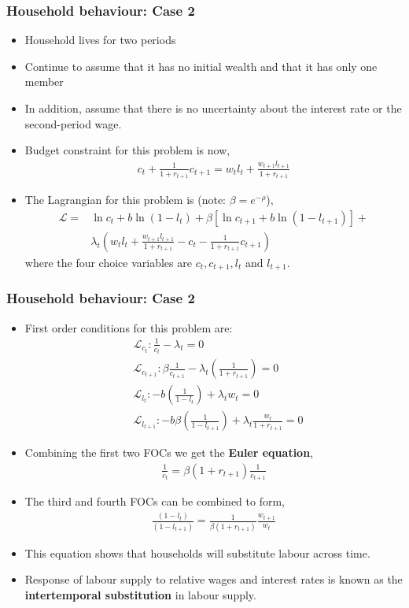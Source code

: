 \documentclass[10pt, handout]{beamer} %
\begin{document}
\begin{frame}
\frametitle{Household behaviour: Case 2}
\small
\begin{itemize}[<+->]
\item Household lives for two periods
\item Continue to assume that it has no initial wealth and that it has only one member
\item In addition, assume that there is no uncertainty about the interest rate or the
second-period wage.
\item Budget constraint for this problem is now,
\begin{align*}
c_{t} + \frac{1}{1+r_{t+1}}c_{t+1} = w_{t}l_{t} + \frac{w_{t+1}l_{t+1}}{1+r_{t+1}}
\end{align*}
\item The Lagrangian for this problem is (note: $\beta = e^{-\rho}$),
\begin{align*}
\mathcal{L} = &\ln{c_{t}} + b\ln(1-l_{t}) + \beta[\ln{c_{t+1}} + b\ln({1 - l_{t+1}})] + \\
& \lambda_{t}\left(w_{t}l_{t} + \frac{w_{t+1}l_{t+1}}{1+r_{t+1}} - c_{t} - \frac{1}{1+r_{t+1}}c_{t+1} \right)
\end{align*}
where the four choice variables are $c_{t}, c_{t+1}, l_{t}$ and $l_{t+1}$.
\end{itemize}
\end{frame}

\begin{frame}
\frametitle{Household behaviour: Case 2}
\small
\begin{itemize}[<+->]
\item First order conditions for this problem are:
\begin{align*}
&\mathcal{L}_{c_t} : \frac{1}{c_{t}} - \lambda_{t} = 0 \\
&\mathcal{L}_{c_{t+1}} : \beta\frac{1}{c_{t+1}} - \lambda_{t}\left(\frac{1}{1 + r_{t+1}}\right) = 0\\
&\mathcal{L}_{l_t} : -b\left(\frac{1}{1 - l_{t}}\right) + \lambda_{t}w_{t} = 0 \\
&\mathcal{L}_{l_{t+1}} : -b\beta\left(\frac{1}{1 - l_{t+1}}\right) + \lambda_{t}\frac{w_{t}}{1+r_{t+1}} = 0
\end{align*}
\item Combining the first two FOCs we get the  \textbf{Euler equation},
\begin{align*}
\frac{1}{c_{t}} = \beta{(1+r_{t+1})}\frac{1}{c_{t+1}}
\end{align*}
\item The third and fourth FOCs can be combined to form,
\begin{align*}
\frac{(1-l_t)}{(1-l_{t+1})} = \frac{1}{\beta{(1+r_{t+1})}}\frac{w_{t+1}}{w_{t}}
\end{align*}
\item This equation shows that households will substitute labour across time.
\item Response of labour supply to relative wages and interest rates is known as the \textbf{intertemporal substitution} in labour supply.
\end{itemize}
\end{frame}
\end{document}
